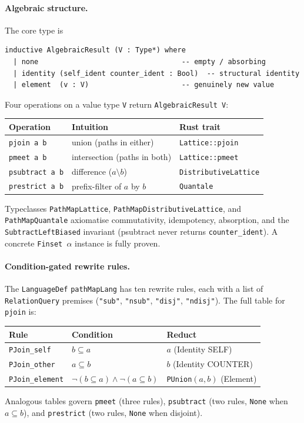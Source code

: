 \documentclass[]{article}
\newcommand{\code}[1]{\texttt{#1}}
\begin{document}
\paragraph{Algebraic structure.}
The core type is
\begin{lstlisting}
inductive AlgebraicResult (V : Type*) where
  | none                                  -- empty / absorbing
  | identity (self_ident counter_ident : Bool)  -- structural identity
  | element  (v : V)                      -- genuinely new value
\end{lstlisting}
Four operations on a value type \code{V} return \code{AlgebraicResult V}:
\begin{center}
\begin{tabular}{lll}
\textbf{Operation} & \textbf{Intuition} & \textbf{Rust trait} \\
\hline
\code{pjoin a b}    & union (paths in either)    & \code{Lattice::pjoin} \\
\code{pmeet a b}    & intersection (paths in both) & \code{Lattice::pmeet} \\
\code{psubtract a b} & difference ($a \setminus b$) & \code{DistributiveLattice} \\
\code{prestrict a b} & prefix-filter of $a$ by $b$ & \code{Quantale} \\
\end{tabular}
\end{center}
Typeclasses \code{PathMapLattice}, \code{PathMapDistributiveLattice},
and \code{PathMapQuantale} axiomatise commutativity, idempotency,
absorption, and the \code{SubtractLeftBiased} invariant (psubtract
never returns \code{counter\_ident}).
A concrete \code{Finset~\(\alpha\)} instance is fully proven.

\paragraph{Condition-gated rewrite rules.}
The \code{LanguageDef} \code{pathMapLang} has ten rewrite rules,
each with a list of \code{RelationQuery} premises
(\code{"sub"}, \code{"nsub"}, \code{"disj"}, \code{"ndisj"}).
The full table for \code{pjoin} is:
\begin{center}
\begin{tabular}{lll}
\textbf{Rule} & \textbf{Condition} & \textbf{Reduct} \\
\hline
\code{PJoin\_self}    & $b \subseteq a$             & $a$ \quad (Identity SELF) \\
\code{PJoin\_other}   & $a \subseteq b$             & $b$ \quad (Identity COUNTER) \\
\code{PJoin\_element} & $\neg(b{\subseteq}a) \wedge \neg(a{\subseteq}b)$ & \code{PUnion}$(a,b)$ \quad (Element) \\
\end{tabular}
\end{center}
Analogous tables govern \code{pmeet} (three rules),
\code{psubtract} (two rules, \code{None} when $a \subseteq b$),
and \code{prestrict} (two rules, \code{None} when disjoint).
\end{document}
